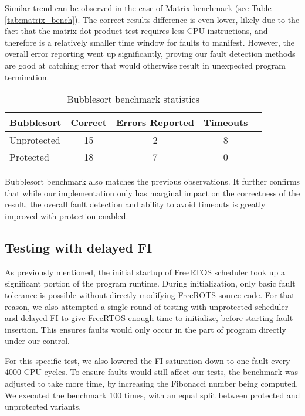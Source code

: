 Similar trend can be observed in the case of Matrix benchmark (see Table \ref{tab:matrix_bench}). The correct results difference is even lower, likely due to the fact that the matrix dot product test requires less CPU instructions, and therefore is a relatively smaller time window for faults to manifest. However, the overall error reporting went up significantly, proving our fault detection methods are good at catching error that would otherwise result in unexpected program termination.

\begin{table}[h]
\centering
\begin{tabular}{|l|c|c|c|c|}
\hline
\textbf{Bubblesort} & \textbf{Correct} & \textbf{Errors Reported} & \textbf{Timeouts} \\
\hline
Unprotected & 15 & 2 & 8 \\
Protected & 18 & 7 & 0 \\
\hline
\end{tabular}
\caption{Bubblesort benchmark statistics}
\label{tab:bubblesort_bench}
\end{table}

Bubblesort benchmark also matches the previous observations. It further confirms that while our implementation only has marginal impact on the correctness of the result, the overall fault detection and ability to avoid timeouts is greatly improved with protection enabled.

\subsection{Testing with delayed FI}

As previously mentioned, the initial startup of FreeRTOS scheduler took up a significant portion of the program runtime. During initialization, only basic fault tolerance is possible without directly modifying FreeROTS source code. For that reason, we also attempted a single round of testing with unprotected scheduler and delayed FI to give FreeRTOS enough time to initialize, before starting fault insertion. This ensures faults would only occur in the part of program directly under our control.

For this specific test, we also lowered the FI saturation down to one fault every 4000 CPU cycles. To ensure faults would still affect our tests, the benchmark was adjusted to take more time, by increasing the Fibonacci number being computed. We executed the benchmark 100 times, with an equal split between protected and unprotected variants.

